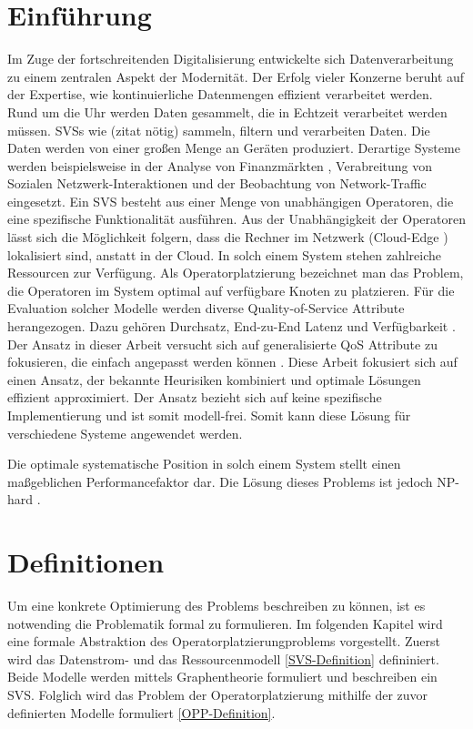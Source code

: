 \documentclass{article}
\begin{document}
\section{Einführung}
Im Zuge der fortschreitenden Digitalisierung entwickelte sich Datenverarbeitung zu einem zentralen Aspekt der Modernität.
Der Erfolg vieler Konzerne beruht auf der Expertise, wie kontinuierliche Datenmengen effizient verarbeitet werden.
Rund um die Uhr werden Daten gesammelt, die in Echtzeit verarbeitet werden müssen. 
SVSs wie (zitat nötig) sammeln, filtern und verarbeiten Daten. Die Daten werden von einer großen Menge an 
Geräten produziert. Derartige Systeme werden beispielsweise in der Analyse von Finanzmärkten \cite{k5}, 
Verabreitung von Sozialen Netzwerk-Interaktionen und der Beobachtung von Network-Traffic \cite{k5} 
eingesetzt. Ein SVS besteht aus einer Menge von unabhängigen Operatoren, die eine spezifische
Funktionalität ausführen. Aus der Unabhängigkeit der Operatoren lässt sich die Möglichkeit folgern, 
dass die Rechner im Netzwerk (Cloud-Edge \cite{k6}) lokalisiert sind, anstatt in der Cloud.
In solch einem System stehen zahlreiche Ressourcen zur Verfügung. 
Als Operatorplatzierung bezeichnet man das Problem, 
die Operatoren im System optimal auf verfügbare Knoten zu platzieren.
Für die Evaluation solcher Modelle werden diverse Quality-of-Service Attribute herangezogen. 
Dazu gehören Durchsatz, End-zu-End Latenz und Verfügbarkeit \cite{k3} \cite{cardellini-optimal_operatorplc}.  Der Ansatz in dieser Arbeit versucht sich auf generalisierte QoS Attribute 
zu fokusieren, die einfach angepasst werden können \cite{k3}.
Diese Arbeit fokusiert sich auf einen Ansatz, der bekannte Heurisiken kombiniert und optimale Lösungen effizient approximiert. Der Ansatz bezieht sich auf keine spezifische
Implementierung und ist somit modell-frei. Somit kann diese Lösung für verschiedene Systeme angewendet werden.

Die optimale systematische Position in solch einem System stellt einen maßgeblichen Performancefaktor dar. Die Lösung dieses Problems ist jedoch NP-hard \cite{cardellini-optimal_operatorplc}.

\section{Definitionen}
Um eine konkrete Optimierung des Problems beschreiben zu können, ist es notwending die Problematik formal zu formulieren. 
Im folgenden Kapitel %
wird eine formale Abstraktion des Operatorplatzierungproblems vorgestellt. Zuerst wird das Datenstrom- 
und das Ressourcenmodell \ref{SVS-Definition} defininiert. Beide Modelle werden mittels Graphentheorie formuliert und beschreiben 
ein SVS. 
Folglich wird das Problem der Operatorplatzierung mithilfe der zuvor definierten Modelle formuliert \ref{OPP-Definition}. 
\end{document}
